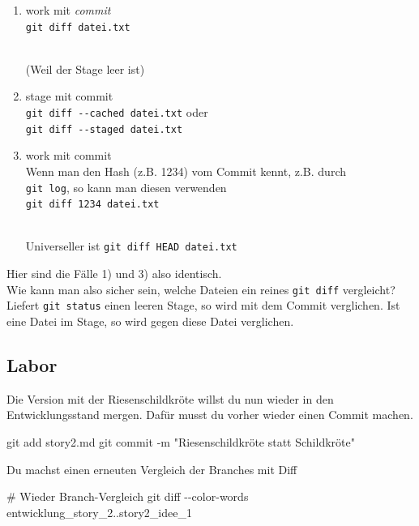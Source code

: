 \documentclass[
  letterpaper,
  DIV=11]{scrreprt}
\newenvironment{Shaded}{\begin{snugshade}}{\end{snugshade}}
\newcommand{\AttributeTok}[1]{\textcolor[rgb]{0.40,0.45,0.13}{#1}}
\newcommand{\CommentTok}[1]{\textcolor[rgb]{0.37,0.37,0.37}{#1}}
\newcommand{\FunctionTok}[1]{\textcolor[rgb]{0.28,0.35,0.67}{#1}}
\newcommand{\NormalTok}[1]{\textcolor[rgb]{0.00,0.23,0.31}{#1}}
\newcommand{\StringTok}[1]{\textcolor[rgb]{0.13,0.47,0.30}{#1}}
\providecommand{\tightlist}{%
  \setlength{\itemsep}{0pt}\setlength{\parskip}{0pt}}\usepackage{longtable,booktabs,array}
\begin{document}
\begin{enumerate}
\def\labelenumi{\arabic{enumi}.}
\tightlist
\item
  work mit \emph{commit}\\
  \texttt{git\ diff\ datei.txt}\strut \\
  (Weil der Stage leer ist)
\item
  stage mit commit\\
  \texttt{git\ diff\ -\/-cached\ datei.txt} oder\\
  \texttt{git\ diff\ -\/-staged\ datei.txt}
\item
  work mit commit\\
  Wenn man den Hash (z.B. 1234) vom Commit kennt, z.B. durch\\
  \texttt{git\ log}, so kann man diesen verwenden\\
  \texttt{git\ diff\ 1234\ datei.txt}\strut \\
  Universeller ist \texttt{git\ diff\ HEAD\ datei.txt}
\end{enumerate}

Hier sind die Fälle 1) und 3) also identisch.\\
Wie kann man also sicher sein, welche Dateien ein reines
\texttt{git\ diff} vergleicht?\\
Liefert \texttt{git\ status} einen leeren Stage, so wird mit dem Commit
verglichen. Ist eine Datei im Stage, so wird gegen diese Datei
verglichen.

\subsection{Labor}\label{labor-3}

Die Version mit der Riesenschildkröte willst du nun wieder in den
Entwicklungsstand mergen. Dafür musst du vorher wieder einen Commit
machen.

\begin{Shaded}
\begin{Highlighting}[]
\FunctionTok{git}\NormalTok{ add story2.md }
\FunctionTok{git}\NormalTok{ commit }\AttributeTok{{-}m} \StringTok{"Riesenschildkröte statt Schildkröte"}
\end{Highlighting}
\end{Shaded}

Du machst einen erneuten Vergleich der Branches mit Diff

\begin{Shaded}
\begin{Highlighting}[]
\CommentTok{\# Wieder Branch{-}Vergleich }
\FunctionTok{git}\NormalTok{ diff }\AttributeTok{{-}{-}color{-}words}\NormalTok{ entwicklung\_story\_2..story2\_idee\_1}
\end{Highlighting}
\end{Shaded}
\end{document}
